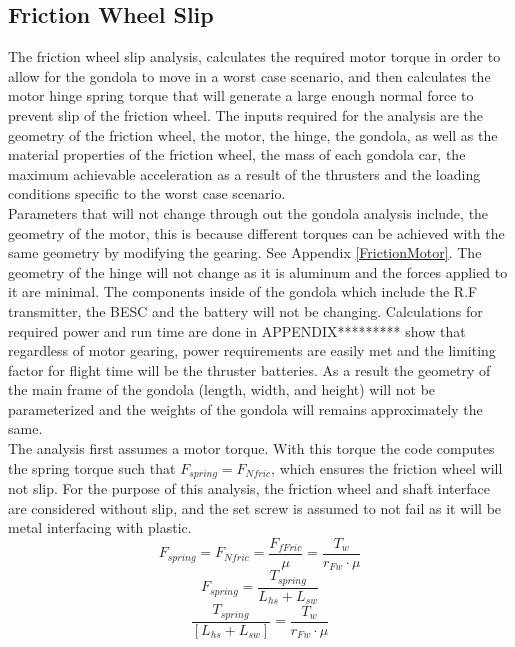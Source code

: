 \documentclass[../main.tex]{subfiles}
\begin{document}
\subsection{Friction Wheel Slip} \label{frictionSlip}
The friction wheel slip analysis, calculates the required motor torque in order to allow for the gondola to move in a worst case scenario, and then calculates the motor hinge spring torque that will generate a large enough normal force to prevent slip of the friction wheel. The inputs required for the analysis are the geometry of the friction wheel, the motor, the hinge, the gondola, as well as the material properties of the friction wheel, the mass of each gondola car, the maximum achievable acceleration as a result of the thrusters and the loading conditions specific to the worst case scenario. \\

Parameters that will not change through out the gondola analysis include, the geometry of the motor, this is because different torques can be achieved with the same geometry by modifying the gearing. See Appendix \ref{FrictionMotor}. The geometry of the hinge will not change as it is aluminum and the forces applied to it are minimal. The components inside of the gondola which include the R.F transmitter, the BESC and the battery will not be changing. Calculations for required power and run time are done in APPENDIX********* show that regardless of motor gearing, power requirements are easily met and the limiting factor for flight time will be the thruster batteries. As a result the geometry of the main frame of the gondola (length, width, and height) will not be parameterized and the weights of the gondola will remains approximately the same. \\

The analysis first assumes a motor torque. With this torque the code computes the spring torque such that $F_{spring} = F_{Nfric}$, which ensures the friction wheel will not slip. For the purpose of this analysis, the friction wheel and shaft interface are considered without slip, and the set screw is assumed to not fail as it will be metal interfacing with plastic.
\begin{equation}
F_{spring} = F_{Nfric} = \frac{F_{fFric}}{\mu} = \frac{T_w}{r_{Fw}\cdot{}\mu}
\end{equation}
\begin{equation}
F_{spring} = \frac{T_{spring}}{L_{hs}+L_{sw}}
\end{equation}
\begin{equation}
\frac{T_{spring}}{[L_{hs}+L_{sw}]} = \frac{T_w}{r_{Fw}\cdot{}\mu}
\end{equation}
\end{document}
